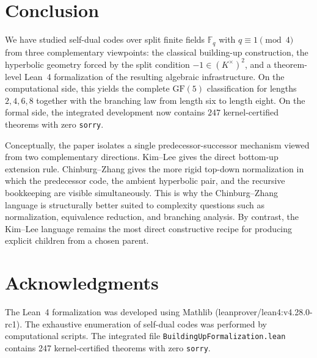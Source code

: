 \documentclass[12pt]{article}
\newcommand{\F}{\mathbb{F}}
\newcommand{\GF}[1]{\ensuremath{\mathrm{GF}(#1)}}
\begin{document}
{\color{red}{More examples over GF(13).}}

\section{Conclusion}
\label{sec:conclusion}

We have studied self-dual codes over split finite fields $\F_q$ with $q\equiv 1 \pmod 4$ from three complementary viewpoints: the classical building-up construction, the hyperbolic geometry forced by the split condition $-1\in (K^\times)^2$, and a theorem-level Lean~4 formalization of the resulting algebraic infrastructure. On the computational side, this yields the complete $\GF{5}$ classification for lengths $2,4,6,8$ together with the branching law from length six to length eight. On the formal side, the integrated development now contains $247$ kernel-certified theorems with zero \texttt{sorry}.

Conceptually, the paper isolates a single predecessor-successor mechanism viewed from two complementary directions. Kim--Lee gives the direct bottom-up extension rule. Chinburg--Zhang gives the more rigid top-down normalization in which the predecessor code, the ambient hyperbolic pair, and the recursive bookkeeping are visible simultaneously. This is why the Chinburg--Zhang language is structurally better suited to complexity questions such as normalization, equivalence reduction, and branching analysis. By contrast, the Kim--Lee language remains the most direct constructive recipe for producing explicit children from a chosen parent.


\section*{Acknowledgments}

The Lean~4 formalization was developed using Mathlib (leanprover/lean4:v4.28.0-rc1). The exhaustive enumeration of self-dual codes was performed by computational scripts. The integrated file \texttt{BuildingUpFormalization.lean} contains 247 kernel-certified theorems with zero \texttt{sorry}.
{\color{red}{Rewrite this part since we have included LEAN in part.}}
\end{document}
